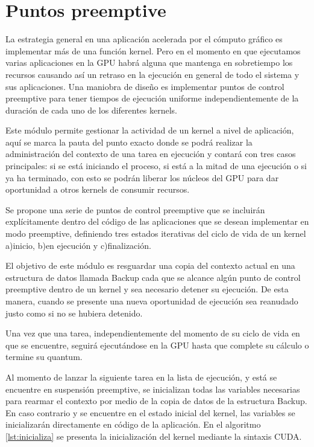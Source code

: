 \section{Puntos preemptive}\label{secc:puntosPreemptive}


La estrategia general en una aplicación acelerada por el cómputo gráfico es implementar más de una función kernel. Pero en el momento en que ejecutamos varias aplicaciones en la GPU habrá alguna que mantenga en sobretiempo los recursos causando así un retraso en la ejecución en general de todo el sistema y sus aplicaciones. Una maniobra de diseño es implementar puntos de control preemptive para tener tiempos de ejecución uniforme independientemente de la duración de cada uno de los diferentes kernels.
\newline

Este módulo permite gestionar la actividad de un kernel a nivel de aplicación, aquí se marca la pauta del punto exacto donde se podrá realizar la administración del contexto de una tarea en ejecución y contará con tres casos principales: si se está iniciando el proceso, si está a la mitad de una ejecución o si ya ha terminado, con esto se podrán liberar los núcleos del GPU para dar oportunidad a otros kernels de consumir recursos.

Se propone una serie de puntos de control preemptive que se incluirán explícitamente dentro del código de las aplicaciones que se desean implementar en modo preemptive, definiendo tres estados iterativas del ciclo de vida de un kernel a)inicio, b)en ejecución y c)finalización. 

El objetivo de este módulo es resguardar una copia del contexto actual en una estructura de datos llamada Backup cada que se alcance algún punto de control preemptive dentro de un kernel y sea necesario detener su ejecución. De esta manera, cuando se  presente una nueva oportunidad de ejecución sea reanudado justo como si no se hubiera detenido.
\newline

Una vez que una tarea, independientemente del momento de su ciclo de vida en que se encuentre, seguirá ejecutándose en la GPU hasta que complete su cálculo o termine su quantum.

Al momento de lanzar la siguiente tarea en la lista de ejecución, y está se encuentre en suspensión preemptive, se inicializan todas las variables necesarias para rearmar el contexto por medio de la copia de datos de la estructura Backup. En caso contrario y se encuentre en el estado inicial del kernel, las variables se inicializarán directamente en código de la aplicación. 
En el algoritmo \ref{lst:inicializa} se presenta la inicialización del kernel mediante la sintaxis CUDA.
\newline

